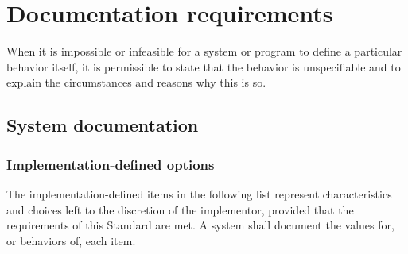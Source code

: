 \chapter{Documentation requirements}
\label{doc}

When it is impossible or infeasible for a system or program to
define a particular behavior itself, it is permissible to state
that the behavior is unspecifiable and to explain the circumstances
and reasons why this is so.

\section{System documentation} %
\label{doc:system}

\subsection{Implementation-defined options} %

The implementation-defined items in the following list represent
characteristics and choices left to the discretion of the
implementor, provided that the requirements of this Standard are
met. A system shall document the values for, or behaviors of, each
item.

